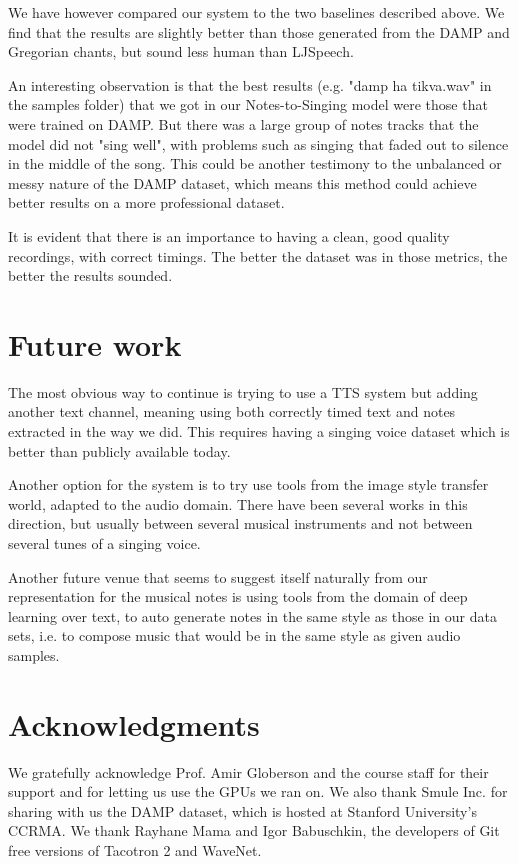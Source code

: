 \documentclass{article}
\begin{document}
We have however compared our system to the two baselines described above.
We find that the results are slightly better than those generated from the DAMP and Gregorian chants, but sound less human than LJSpeech.

An interesting observation is that the best results (e.g. "damp ha tikva.wav" in the samples folder) that we got in our Notes-to-Singing model were those that were trained on DAMP.
But there was a large group of notes tracks that the model did not "sing well", with problems such as singing that faded out to silence in the middle of the song.
This could be another testimony to the unbalanced or messy nature of the DAMP dataset, which means this method could achieve better results on a more professional dataset.

It is evident that there is an importance to having a clean, good quality recordings, with correct timings.
The better the dataset was in those metrics, the better the results sounded.

\section*{Future work}
The most obvious way to continue is trying to use a TTS system but adding another text channel, meaning using both correctly timed text and notes extracted in the way we did.
This requires having a singing voice dataset which is better than publicly available today.

Another option for the system is to try use tools from the image style transfer world, adapted to the audio domain.
There have been several works in this direction, but usually between several musical instruments and not between several tunes of a singing voice.

Another future venue that seems to suggest itself naturally from our representation for the musical notes is using tools from the domain of deep learning over text, to auto generate notes in the same style as those in our data sets, i.e. to compose music that would be in the same style as given audio samples.

\section*{Acknowledgments}
We gratefully acknowledge Prof. Amir Globerson and the course staff for their support and for letting us use the GPUs we ran on.
We also thank Smule Inc. for sharing with us the DAMP dataset, which is hosted at Stanford University's CCRMA. 
We thank Rayhane Mama and Igor Babuschkin, the developers of Git free versions of Tacotron 2 and WaveNet.




\end{document}

